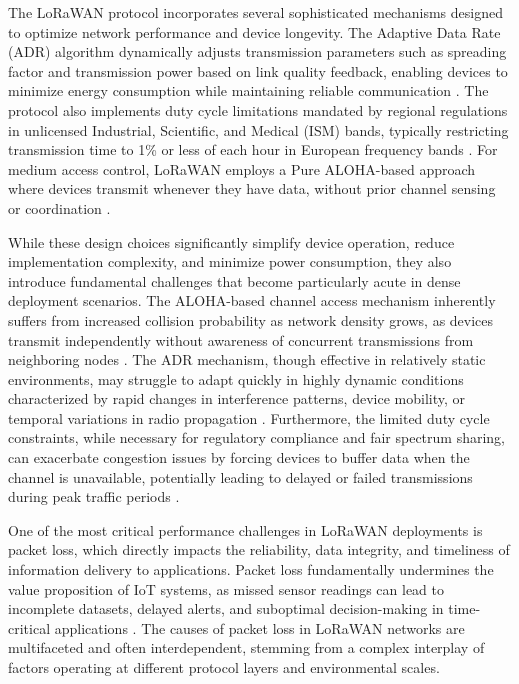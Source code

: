 \documentclass[12pt,a4paper]{article}
\begin{document}
The LoRaWAN protocol incorporates several sophisticated mechanisms designed to optimize network performance and device longevity. The Adaptive Data Rate (ADR) algorithm dynamically adjusts transmission parameters such as spreading factor and transmission power based on link quality feedback, enabling devices to minimize energy consumption while maintaining reliable communication \cite{cuomo2017explora}. The protocol also implements duty cycle limitations mandated by regional regulations in unlicensed Industrial, Scientific, and Medical (ISM) bands, typically restricting transmission time to 1\% or less of each hour in European frequency bands \cite{vangelista2015long}. For medium access control, LoRaWAN employs a Pure ALOHA-based approach where devices transmit whenever they have data, without prior channel sensing or coordination \cite{georgiou2017low}.

While these design choices significantly simplify device operation, reduce implementation complexity, and minimize power consumption, they also introduce fundamental challenges that become particularly acute in dense deployment scenarios. The ALOHA-based channel access mechanism inherently suffers from increased collision probability as network density grows, as devices transmit independently without awareness of concurrent transmissions from neighboring nodes \cite{bor2016lora}. The ADR mechanism, though effective in relatively static environments, may struggle to adapt quickly in highly dynamic conditions characterized by rapid changes in interference patterns, device mobility, or temporal variations in radio propagation \cite{slabicki2018adaptive}. Furthermore, the limited duty cycle constraints, while necessary for regulatory compliance and fair spectrum sharing, can exacerbate congestion issues by forcing devices to buffer data when the channel is unavailable, potentially leading to delayed or failed transmissions during peak traffic periods \cite{mikhaylov2016analysis}.

One of the most critical performance challenges in LoRaWAN deployments is packet loss, which directly impacts the reliability, data integrity, and timeliness of information delivery to applications. Packet loss fundamentally undermines the value proposition of IoT systems, as missed sensor readings can lead to incomplete datasets, delayed alerts, and suboptimal decision-making in time-critical applications \cite{centenaro2016long}. The causes of packet loss in LoRaWAN networks are multifaceted and often interdependent, stemming from a complex interplay of factors operating at different protocol layers and environmental scales.
\end{document}
